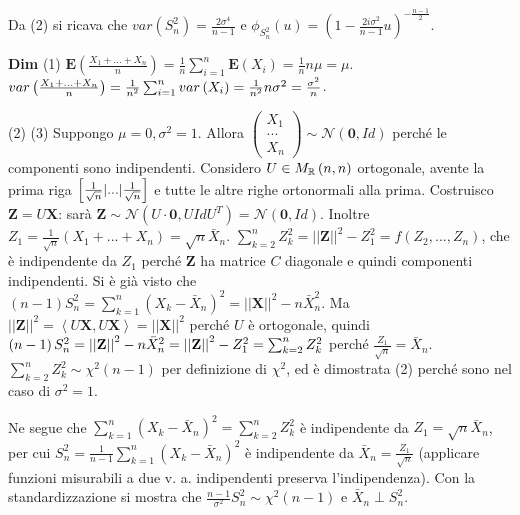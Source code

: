 \documentclass{article}
\begin{document}
Da (2) si ricava che $var\left( S_{n}^{2}\right) =\frac{2\sigma ^{4}}{n-1}$
e $\phi _{S_{n}^{2}}\left( u\right) =\left( 1-\frac{2i\sigma ^{2}}{n-1}%
u\right) ^{-\frac{n-1}{2}}$.

\textbf{Dim} (1) $\mathbf{E}\left( \frac{X_{1}+...+X_{n}}{n}\right) =\frac{1%
}{n}\sum_{i=1}^{n}\mathbf{E}\left( X_{i}\right) =\frac{1}{n}n\mu =\mu $. $%
var\left( \frac{X_{1}+...+X_{n}}{n}\right) =\frac{1}{n^{2}}%
\sum_{i=1}^{n}var\left( X_{i}\right) =\frac{1}{n^{2}}n\sigma ^{2}=\frac{%
\sigma ^{2}}{n}$.

(2) (3) Suppongo $\mu =0,\sigma ^{2}=1$. Allora $\left( 
\begin{array}{c}
X_{1} \\ 
... \\ 
X_{n}%
\end{array}%
\right) \sim \mathcal{N}\left( \mathbf{0},Id\right) $ perch\'{e} le
componenti sono indipendenti. Considero $U\in M_{%
\mathbb{R}
}\left( n,n\right) $ ortogonale, avente la prima riga $\left[ \frac{1}{\sqrt{%
n}}|...|\frac{1}{\sqrt{n}}\right] $ e tutte le altre righe ortonormali alla
prima. Costruisco $\mathbf{Z}=U\mathbf{X}$: sar\`{a} $\mathbf{Z}\sim 
\mathcal{N}\left( U\cdot \mathbf{0},UIdU^{T}\right) =\mathcal{N}\left( 
\mathbf{0},Id\right) $. Inoltre $Z_{1}=\frac{1}{\sqrt{n}}\left(
X_{1}+...+X_{n}\right) =\sqrt{n}\bar{X}_{n}$. $\sum_{k=2}^{n}Z_{k}^{2}=\left%
\vert \left\vert \mathbf{Z}\right\vert \right\vert ^{2}-Z_{1}^{2}=f\left(
Z_{2},...,Z_{n}\right) $, che \`{e} indipendente da $Z_{1}$ perch\'{e} $%
\mathbf{Z}$ ha matrice $C$ diagonale e quindi componenti indipendenti. Si 
\`{e} gi\`{a} visto che $\left( n-1\right) S_{n}^{2}=\sum_{k=1}^{n}\left(
X_{k}-\bar{X}_{n}\right) ^{2}=\left\vert \left\vert \mathbf{X}\right\vert
\right\vert ^{2}-n\bar{X}_{n}^{2}$. Ma $\left\vert \left\vert \mathbf{Z}%
\right\vert \right\vert ^{2}=\left\langle U\mathbf{X,}U\mathbf{X}%
\right\rangle =\left\vert \left\vert \mathbf{X}\right\vert \right\vert ^{2}$
perch\'{e} $U$ \`{e} ortogonale, quindi $\left( n-1\right)
S_{n}^{2}=\left\vert \left\vert \mathbf{Z}\right\vert \right\vert ^{2}-n\bar{%
X}_{n}^{2}=\left\vert \left\vert \mathbf{Z}\right\vert \right\vert
^{2}-Z_{1}^{2}=\sum_{k=2}^{n}Z_{k}^{2}$ perch\'{e} $\frac{Z_{1}}{\sqrt{n}}=%
\bar{X}_{n}$. $\sum_{k=2}^{n}Z_{k}^{2}\sim \chi ^{2}\left( n-1\right) $ per
definizione di $\chi ^{2}$, ed \`{e} dimostrata (2) perch\'{e} sono nel caso
di $\sigma ^{2}=1$.

Ne segue che $\sum_{k=1}^{n}\left( X_{k}-\bar{X}_{n}\right)
^{2}=\sum_{k=2}^{n}Z_{k}^{2}$ \`{e} indipendente da $Z_{1}=\sqrt{n}\bar{X}%
_{n}$, per cui $S_{n}^{2}=\frac{1}{n-1}\sum_{k=1}^{n}\left( X_{k}-\bar{X}%
_{n}\right) ^{2}$ \`{e} indipendente da $\bar{X}_{n}=\frac{Z_{1}}{\sqrt{n}}$
(applicare funzioni misurabili a due v. a. indipendenti preserva
l'indipendenza). Con la standardizzazione si mostra che $\frac{n-1}{\sigma
^{2}}S_{n}^{2}\sim \chi ^{2}\left( n-1\right) $ e $\bar{X}_{n}\perp
S_{n}^{2} $.
\end{document}
